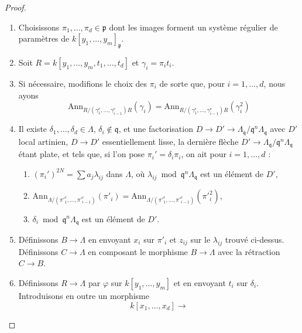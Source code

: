 \begin{proof}
\begin{enumerate}
$$$$
telle que la première flèche soit essentiellement lisse, la seconde plate,
que $E$ soit contenu dans $D$, et, avec $\mathfrak p = \varphi^{-1}(\mathfrak q)$,
que le morphisme $k[y_1, \ldots, y_m]_\mathfrak p \to \Lambda_\mathfrak q$ soit
plat et que $\mathfrak p \Lambda_\mathfrak q = \mathfrak q \Lambda_\mathfrak q$.
\item
\label{item-choose-pii}
Choisissons $\pi_1, \ldots, \pi_d \in \mathfrak p$ dont les images forment un
système régulier de paramètres de $k[y_1, \ldots, y_m]_\mathfrak p$.
\item
\label{item-set-R}
Soit $R = k[y_1, \ldots, y_m, t_1, \ldots, t_d]$ et $\gamma_i = \pi_i t_i$.
\item
\label{item-modify-pii}
Si nécessaire, modifions le choix des $\pi_i$ de sorte que,
pour $i = 1, \ldots, d$, nous ayons
$$
\text{Ann}_{R/(\gamma_1^e, \ldots, \gamma_{i - 1}^e)R}(\gamma_i)
=
\text{Ann}_{R/(\gamma_1^e, \ldots, \gamma_{i - 1}^e)R}(\gamma_i^2)
$$
\item
\label{item-choose-deltai}
Il existe $\delta_1, \ldots, \delta_d \in \Lambda$,
$\delta_i \not \in \mathfrak q$, et une factorisation
$D \to D' \to \Lambda_\mathfrak q/\mathfrak q^n\Lambda_\mathfrak q$
avec $D'$ local artinien, $D \to D'$ essentiellement lisse, la dernière flèche
$D' \to \Lambda_\mathfrak q/\mathfrak q^n\Lambda_\mathfrak q$
étant plate, et tels que, si l'on pose $\pi_i' = \delta_i \pi_i$, on ait pour
$i = 1, \ldots, d$ :
\begin{enumerate}
\item $(\pi_i')^{2N} = \sum a_j\lambda_{ij}$ dans $\Lambda$, où
$\lambda_{ij} \bmod \mathfrak q^n\Lambda_\mathfrak q$ est un élément de $D'$,
\item $\text{Ann}_{\Lambda/({\pi'}_1^e, \ldots, {\pi'}_{i - 1}^e)}({\pi'}_i) =
\text{Ann}_{\Lambda/({\pi'}_1^e, \ldots, {\pi'}_{i - 1}^e)}({\pi'}_i^2)$,
\item $\delta_i \bmod \mathfrak q^n\Lambda_\mathfrak q$ est un élément de $D'$.
\end{enumerate}
\item
\label{item-map-B-Lambda}
Définissons $B \to \Lambda$ en envoyant $x_i$ sur $\pi'_i$ et
$z_{ij}$ sur le $\lambda_{ij}$ trouvé ci-dessus. Définissons $C \to \Lambda$
en composant le morphisme $B \to \Lambda$ avec la rétraction $C \to B$.
\item
\label{item-set-map-R}
Définissons $R \to \Lambda$ par $\varphi$ sur $k[y_1, \ldots, y_m]$
et en envoyant $t_i$ sur $\delta_i$. Introduisons en outre un morphisme
$$
k[x_1, \ldots, x_d]
\longrightarrow
$$
\end{enumerate}
\end{proof}
